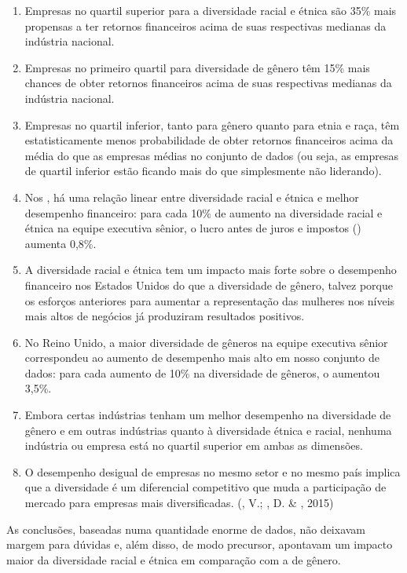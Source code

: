 \begin{enumerate}
\def\labelenumi{\arabic{enumi}.}
\item
  Empresas no quartil superior para a diversidade racial e étnica são
  35\% mais propensas a ter retornos financeiros acima de suas
  respectivas medianas da indústria nacional.
\item
  Empresas no primeiro quartil para diversidade de gênero têm 15\% mais
  chances de obter retornos financeiros acima de suas respectivas
  medianas da indústria nacional.
\item
  Empresas no quartil inferior, tanto para gênero quanto para etnia e
  raça, têm estatisticamente menos probabilidade de obter retornos
  financeiros acima da média do que as empresas médias no conjunto de
  dados (ou seja, as empresas de quartil inferior estão ficando mais do
  que simplesmente não liderando).
\item
  Nos , há uma relação linear entre diversidade racial e étnica e
  melhor desempenho financeiro: para cada 10\% de aumento na diversidade
  racial e étnica na equipe executiva sênior, o lucro antes de juros e
  impostos () aumenta 0,8\%.
\item
  A diversidade racial e étnica tem um impacto mais forte sobre o
  desempenho financeiro nos Estados Unidos do que a diversidade de
  gênero, talvez porque os esforços anteriores para aumentar a
  representação das mulheres nos níveis mais altos de negócios já
  produziram resultados positivos.
\item
  No Reino Unido, a maior diversidade de gêneros na equipe executiva
  sênior correspondeu ao aumento de desempenho mais alto em nosso
  conjunto de dados: para cada aumento de 10\% na diversidade de
  gêneros, o  aumentou 3,5\%.
\item
  Embora certas indústrias tenham um melhor desempenho na diversidade de
  gênero e em outras indústrias quanto à diversidade étnica e racial,
  nenhuma indústria ou empresa está no quartil superior em ambas as
  dimensões.
\item
  O desempenho desigual de empresas no mesmo setor e no mesmo país
  implica que a diversidade é um diferencial competitivo que muda a
  participação de mercado para empresas mais diversificadas. (, V.;
  , D. \& , 2015)
\end{enumerate}

As conclusões, baseadas numa quantidade enorme de dados, não deixavam
margem para dúvidas e, além disso, de modo precursor, apontavam um
impacto maior da diversidade racial e étnica em comparação com a de
gênero.

